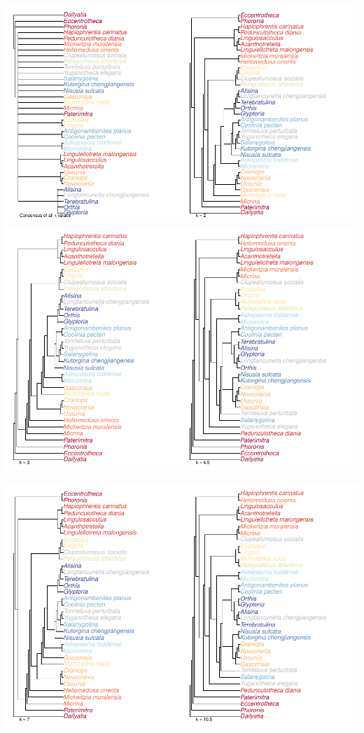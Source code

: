 \documentclass[]{book}
\theoremstyle{definition}
\theoremstyle{definition}
\theoremstyle{definition}
\theoremstyle{remark}
\begin{document}
\includegraphics{Brachiopod_phylogeny_files/figure-latex/unnamed-chunk-6-1.pdf}
\includegraphics{Brachiopod_phylogeny_files/figure-latex/unnamed-chunk-7-1.pdf}

\includegraphics{Brachiopod_phylogeny_files/figure-latex/unnamed-chunk-8-1.pdf}
\end{document}
